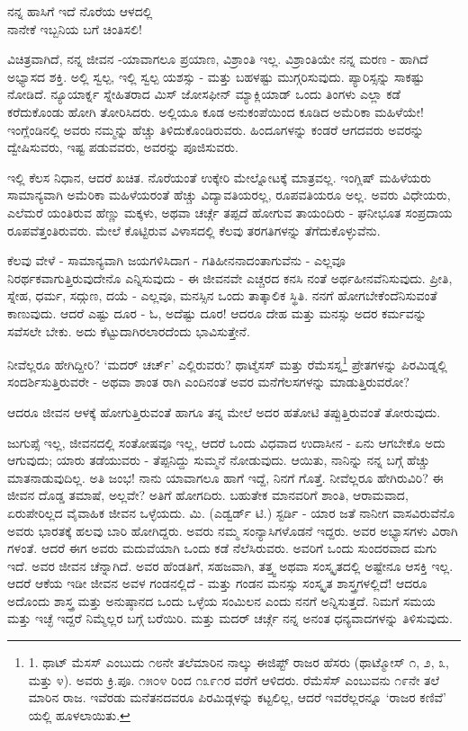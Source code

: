 \begin{myquote}
ನನ್ನ ಹಾಸಿಗೆ ಇದೆ ನೊರೆಯ ಆಳದಲ್ಲಿ\\ನಾನೇಕೆ ಇಬ್ಬನಿಯ ಬಗೆ ಚಿಂತಿಸಲಿ!
\end{myquote}

ವಿಚಿತ್ರವಾಗಿದೆ, ನನ್ನ ಜೀವನ -ಯಾವಾಗಲೂ ಪ್ರಯಾಣ, ವಿಶ್ರಾಂತಿ ಇಲ್ಲ. ವಿಶ್ರಾಂತಿಯೇ ನನ್ನ ಮರಣ - ಹಾಗಿದೆ ಅಭ್ಯಾಸದ ಶಕ್ತಿ. ಅಲ್ಲಿ ಸ್ವಲ್ಪ, ಇಲ್ಲಿ ಸ್ವಲ್ಪ ಯಶಸ್ಸು - ಮತ್ತು ಬಹಳಷ್ಟು ಮುಗ್ಗರಿಸುವುದು. ಪ್ಯಾರಿಸ್ಸನ್ನು ಸಾಕಷ್ಟು ನೋಡಿದೆ. ನ್ಯೂಯಾರ್ಕ್ನ ಸ್ನೇಹಿತರಾದ ಮಿಸ್ ಜೋಸಫೀನ್ ಮ್ಯಾಕ್ಲಿಯಾಡ್ ಒಂದು ತಿಂಗಳು ಎಲ್ಲಾ ಕಡೆ ಕರೆದುಕೊಂಡು ಹೋಗಿ ತೋರಿಸಿದರು. ಅಲ್ಲಿಯೂ ಕೂಡ ಅನುಕಂಪೆಯಿಂದ ಕೂಡಿದ ಅಮೆರಿಕಾ ಮಹಿಳೆಯೇ! ಇಂಗ್ಲೆಂಡಿನಲ್ಲಿ ಅವರು ನಮ್ಮನ್ನು ಹೆಚ್ಚು ತಿಳಿದುಕೊಂಡಿರುವರು. ಹಿಂದೂಗಳನ್ನು ಕಂಡರೆ ಆಗದವರು ಅವರನ್ನು ದ್ವೇಷಿಸುವರು, ಇಷ್ಟ ಪಡುವವರು, ಅವರನ್ನು ಪೂಜಿಸುವರು.

ಇಲ್ಲಿ ಕೆಲಸ ನಿಧಾನ, ಆದರೆ ಖಚಿತ. ನೊರೆಯಂತೆ ಉಕ್ಕೇರಿ ಮೇಲ್ನೋಟಕ್ಕೆ ಮಾತ್ರವಲ್ಲ. ಇಂಗ್ಲಿಷ್ ಮಹಿಳೆಯರು ಸಾಮಾನ್ಯವಾಗಿ ಅಮೆರಿಕಾ ಮಹಿಳೆಯರಂತೆ ಹೆಚ್ಚು ವಿದ್ಯಾವತಿಯರಲ್ಲ, ರೂಪವತಿಯರೂ ಅಲ್ಲ. ಅವರು ವಿಧೇಯರು, ಎಲೆಮರೆ ಯಂತಿರುವ ಹೆಣ್ಣು ಮಕ್ಕಳು, ಅಥವಾ ಚರ್ಚ್ಗೆ ತಪ್ಪದೆ ಹೋಗುವ ತಾಯಂದಿರು - ಘನೀಭೂತ ಸಂಪ್ರದಾಯ ರೂಪವೆತ್ತಂತಿರುವರು. ಮೇಲೆ ಕೊಟ್ಟಿರುವ ವಿಳಾಸದಲ್ಲಿ ಕೆಲವು ತರಗತಿಗಳನ್ನು ತೆಗೆದುಕೊಳ್ಳುವೆನು.

ಕೆಲವು ವೇಳೆ - ಸಾಮಾನ್ಯವಾಗಿ ಜಯಗಳಿಸಿದಾಗ - ಗತಿಹೀನನಾದಂತಾಗುವೆನು - ಎಲ್ಲವೂ ನಿರರ್ಥಕವಾಗುತ್ತಿರುವುದೇನೊ ಎನ್ನಿಸುವುದು - ಈ ಜೀವನವೇ ಎಚ್ಚರದ ಕನಸಿ ನಂತೆ ಅರ್ಥಹೀನವೆನಿಸುವುದು. ಪ್ರೀತಿ, ಸ್ನೇಹ, ಧರ್ಮ, ಸದ್ಗುಣ, ದಯೆ - ಎಲ್ಲವೂ, ಮನಸ್ಸಿನ ಒಂದು ತಾತ್ಕಾಲಿಕ ಸ್ಥಿತಿ. ನನಗೆ ಹೋಗಬೇಕೆಂದೆನಿಸುವಂತೆ ಕಾಣುವುದು. ಆದರೆ ಎಷ್ಟು ದೂರ - ಓ, ಅದೆಷ್ಟು ದೂರ! ಆದರೂ ದೇಹ ಮತ್ತು ಮನಸ್ಸು ಅದರ ಕರ್ಮವನ್ನು ಸವೆಸಲೇ ಬೇಕು. ಅದು ಕೆಟ್ಟುದಾಗಿರಲಾರದೆಂದು ಭಾವಿಸುತ್ತೇನೆ.

ನೀವೆಲ್ಲರೂ ಹೇಗಿದ್ದೀರಿ? ‘ಮದರ್ ಚರ್ಚ್’ ಎಲ್ಲಿರುವರು? ಥಾಟ್ಮೆಸಸ್ ಮತ್ತು ರೆಮೆಸಸ್ನ\footnote{1. ಥಾಟ್ ಮೆಸಸ್ ಎಂಬುದು ೧೮ನೇ ತಲೆಮಾರಿನ ನಾಲ್ಕು ಈಜಿಪ್ಟ್ ರಾಜರ ಹೆಸರು (ಥಾಟ್ಮೋಸ್ ೧, ೨, ೩, ಮತ್ತು ೪). ಅವರು ಕ್ರಿ.ಪೂ. ೧೫೦೪ ರಿಂದ ೧೩೯೧ರ ವರೆಗೆ ಆಳಿದರು. ರೆಮೆಸೆಸ್ ಎಂಬುವನು ೧೯ನೇ ತಲೆ ಮಾರಿನ ರಾಜ. ಇವೆರಡು ಮನೆತನದವರೂ ಪಿರಮಿಡ್ಗಳನ್ನು ಕಟ್ಟಲಿಲ್ಲ, ಆದರೆ ಇವರೆಲ್ಲರನ್ನೂ ‘ರಾಜರ ಕಣಿವೆ’ ಯಲ್ಲಿ ಹೂಳಲಾಯಿತು.} ಪ್ರೇತಗಳನ್ನು ಪಿರಮಿಡ್ನಲ್ಲಿ ಸಂದರ್ಶಿಸುತ್ತಿರುವರೇ - ಅಥವಾ ಶಾಂತ ರಾಗಿ ಎಂದಿನಂತೆ ಅವರ ಮನೆಗೆಲಸಗಳನ್ನು ಮಾಡುತ್ತಿರುವರೋ?

ಆದರೂ ಜೀವನ ಆಳಕ್ಕೆ ಹೋಗುತ್ತಿರುವಂತೆ ಹಾಗೂ ತನ್ನ ಮೇಲೆ ಅದರ ಹತೋಟಿ ತಪ್ಪುತ್ತಿರುವಂತೆ ತೋರುವುದು.

ಜುಗುಪ್ಸೆ ಇಲ್ಲ, ಜೀವನದಲ್ಲಿ ಸಂತೋಷವೂ ಇಲ್ಲ, ಆದರೆ ಒಂದು ವಿಧವಾದ ಉದಾಸೀನ - ಏನು ಆಗಬೇಕೊ ಅದು ಆಗುವುದು; ಯಾರು ತಡೆಯುವರು - ತೆಪ್ಪನಿದ್ದು ಸುಮ್ಮನೆ ನೋಡುವುದು. ಆಯಿತು, ನಾನಿನ್ನು ನನ್ನ ಬಗ್ಗೆ ಹೆಚ್ಚು ಮಾತನಾಡುವುದಿಲ್ಲ. ಅತಿ ಜಂಭ! ನಾನು ಯಾವಾಗಲೂ ಹಾಗೆ ಇದ್ದೆ, ನಿನಗೆ ಗೊತ್ತೆ. ನೀವೆಲ್ಲರೂ ಹೇಗಿರುವಿರಿ? ಈ ಜೀವನ ದೊಡ್ಡ ತಮಾಷೆ, ಅಲ್ಲವೇ? ಅತಿಗೆ ಹೋಗದಿರು. ಬಹುತೇಕ ಮಾನವರಿಗೆ ಶಾಂತಿ, ಆರಾಮವಾದ, ಏರುಪೇರಿಲ್ಲದ ವೈವಾಹಿಕ ಜೀವನ ಒಳ್ಳೆಯದು. ಮಿ. (ಎಡ್ವರ್ಡ್ ಟಿ.) ಸ್ಟರ್ಡಿ - ಯಾರ ಜತೆ ನಾನೀಗ ವಾಸವಿರುವೆನೊ ಅವರು ಭಾರತಕ್ಕೆ ಹಲವು ಬಾರಿ ಹೋಗಿದ್ದರು. ಅವರು ನಮ್ಮ ಸಂನ್ಯಾಸಿಗಳೊಡನೆ ಇದ್ದರು. ಅವರ ಅಭ್ಯಾಸಗಳು ವಿರಾಗಿ ಗಳಂತೆ. ಆದರೆ ಈಗ ಅವರು ಮದುವೆಯಾಗಿ ಒಂದು ಕಡೆ ನೆಲೆಸಿರುವರು. ಅವರಿಗೆ ಒಂದು ಸುಂದರವಾದ ಮಗು ಇದೆ. ಅವರ ಜೀವನ ಚೆನ್ನಾಗಿದೆ. ಅವರ ಹೆಂಡತಿಗೆ, ಸಹಜವಾಗಿ, ತತ್ತ್ವ ಅಥವಾ ಸಂಸ್ಕೃತದಲ್ಲಿ ಅಷ್ಟೇನೂ ಆಸಕ್ತಿ ಇಲ್ಲ. ಆದರೆ ಆಕೆಯ ಇಡೀ ಜೀವನ ಅವಳ ಗಂಡನಲ್ಲಿದೆ - ಮತ್ತು ಗಂಡನ ಮನಸ್ಸು ಸಂಸ್ಕೃತ ಶಾಸ್ತ್ರಗಳಲ್ಲಿದೆ! ಆದರೂ ಅದೊಂದು ಶಾಸ್ತ್ರ ಮತ್ತು ಅನುಷ್ಠಾನದ ಒಂದು ಒಳ್ಳೆಯ ಸಂಮಿಲನ ಎಂದು ನನಗೆ ಅನ್ನಿಸುತ್ತದೆ. ನಿಮಗೆ ಸಮಯ ಮತ್ತು ಇಚ್ಛೆ ಇದ್ದರೆ ನಿಮ್ಮೆಲ್ಲರ ಬಗ್ಗೆ ಬರೆಯಿರಿ. ಮತ್ತು ಮದರ್ ಚರ್ಚ್ಗೆ ನನ್ನ ಅನಂತ ಧನ್ಯವಾದಗಳನ್ನು ತಿಳಿಸುವುದು.

